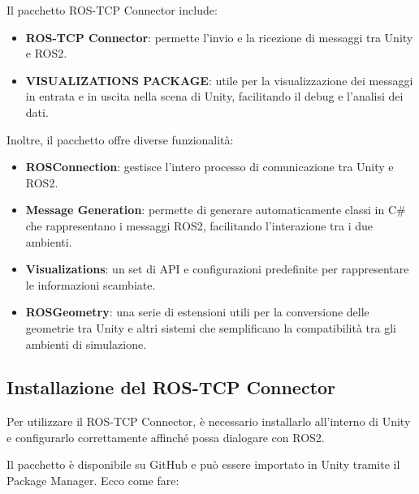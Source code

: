 \documentclass[11pt]{report}
\begin{document}
Il pacchetto ROS-TCP Connector include:

\begin{itemize}
    \item \textbf{ROS-TCP Connector}: permette l’invio e la ricezione di messaggi tra Unity e ROS2.
    \item \textbf{VISUALIZATIONS PACKAGE}: utile per la visualizzazione dei messaggi in entrata e in uscita nella scena di Unity, facilitando il debug e l'analisi dei dati.
\end{itemize}

Inoltre, il pacchetto offre diverse funzionalità:

\begin{itemize}
    \item \textbf{ROSConnection}: gestisce l’intero processo di comunicazione tra Unity e ROS2.
    \item \textbf{Message Generation}: permette di generare automaticamente classi in C\# che rappresentano i messaggi ROS2, facilitando l’interazione tra i due ambienti.
    \item \textbf{Visualizations}: un set di API e configurazioni predefinite per rappresentare le informazioni scambiate.
    \item \textbf{ROSGeometry}: una serie di estensioni utili per la conversione delle geometrie tra Unity e altri sistemi che semplificano la compatibilità tra gli ambienti di simulazione.
\end{itemize}

\subsection*{\textbf{Installazione del ROS-TCP Connector}}

Per utilizzare il ROS-TCP Connector, è necessario installarlo all’interno di Unity e configurarlo correttamente affinché possa dialogare con ROS2.

Il pacchetto è disponibile su GitHub e può essere importato in Unity tramite il Package Manager. Ecco come fare:
\end{document}
